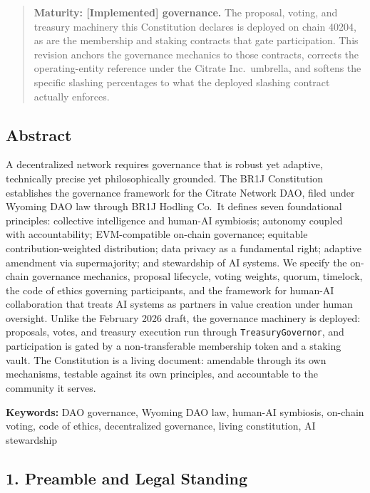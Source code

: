 \begin{quote}
\textbf{Maturity: {[}Implemented{]} governance.} The proposal, voting,
and treasury machinery this Constitution declares is deployed on chain
40204, as are the membership and staking contracts that gate
participation. This revision anchors the governance mechanics to those
contracts, corrects the operating-entity reference under the Citrate
Inc.~umbrella, and softens the specific slashing percentages to what the
deployed slashing contract actually enforces.
\end{quote}

\subsection{Abstract}\label{abstract}

A decentralized network requires governance that is robust yet adaptive,
technically precise yet philosophically grounded. The BR1J Constitution
establishes the governance framework for the Citrate Network DAO, filed
under Wyoming DAO law through BR1J Hodling Co.~It defines seven
foundational principles: collective intelligence and human-AI symbiosis;
autonomy coupled with accountability; EVM-compatible on-chain
governance; equitable contribution-weighted distribution; data privacy
as a fundamental right; adaptive amendment via supermajority; and
stewardship of AI systems. We specify the on-chain governance mechanics,
proposal lifecycle, voting weights, quorum, timelock, the code of ethics
governing participants, and the framework for human-AI collaboration
that treats AI systems as partners in value creation under human
oversight. Unlike the February 2026 draft, the governance machinery is
deployed: proposals, votes, and treasury execution run through
\texttt{TreasuryGovernor}, and participation is gated by a
non-transferable membership token and a staking vault. The Constitution
is a living document: amendable through its own mechanisms, testable
against its own principles, and accountable to the community it serves.

\textbf{Keywords:} DAO governance, Wyoming DAO law, human-AI symbiosis,
on-chain voting, code of ethics, decentralized governance, living
constitution, AI stewardship

\subsection{1. Preamble and Legal
Standing}\label{preamble-and-legal-standing}

